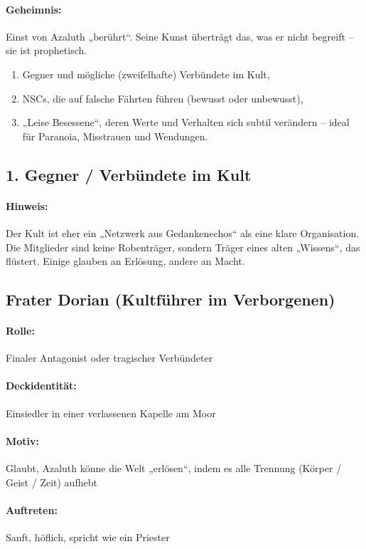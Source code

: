 \paragraph{Geheimnis:}
Einst von Azaluth „berührt“. Seine Kunst überträgt das, was er nicht begreift – sie ist prophetisch.
\newpage
\begin{enumerate}
\item Gegner und mögliche (zweifelhafte) Verbündete im Kult,
\item NSCs, die auf falsche Fährten führen (bewusst oder unbewusst),
\item „Leise Besessene“, deren Werte und Verhalten sich subtil verändern – ideal für Paranoia, Misstrauen und Wendungen.
\end{enumerate}
   

\subsection*{1. Gegner / Verbündete im Kult}
\paragraph{Hinweis:} Der Kult ist eher ein „Netzwerk aus Gedankenechos“ als eine klare Organisation. Die Mitglieder sind keine Robenträger, sondern Träger eines alten „Wissens“, das flüstert. Einige glauben an Erlösung, andere an Macht.

\subsection{Frater Dorian (Kultführer im Verborgenen)}
\paragraph{Rolle:} Finaler Antagonist oder tragischer Verbündeter
\paragraph{Deckidentität:} Einsiedler in einer verlassenen Kapelle am Moor
\paragraph{Motiv:} Glaubt, Azaluth könne die Welt „erlösen“, indem es alle Trennung (Körper / Geist / Zeit) aufhebt
\paragraph{Auftreten:} Sanft, höflich, spricht wie ein Priester
